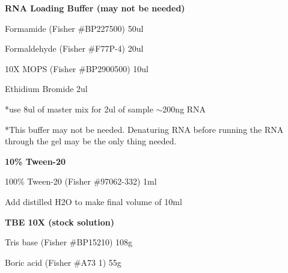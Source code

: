 \documentclass[11pt, oneside]{article}
\begin{document}
		\vspace{5mm}

		{\bf RNA Loading Buffer (may not be needed)}

			\hspace{2mm}Formamide \hspace{9mm}	(Fisher \#BP227500)	\hspace{5mm}	50ul

			\hspace{2mm}Formaldehyde \hspace{5mm}	(Fisher \#F77P-4)	\hspace{9mm}	20ul

			\hspace{2mm}10X MOPS 	\hspace{9mm}	(Fisher \#BP2900500) \hspace{3mm}	10ul

			\hspace{2mm}Ethidium Bromide	\hspace{40mm}					2ul

			\hspace{2mm}*use 8ul of master mix for 2ul of sample $\sim$200ng RNA

			\begin{adjustwidth}{7mm}{0pt}*This buffer may not be needed. Denaturing RNA before running the RNA through the gel may be the only 				thing needed. 
			\end{adjustwidth}
			
		\vspace{5mm}

		{\bf 10\% Tween-20}

			\hspace{2mm}100\% Tween-20 \hspace{2mm}(Fisher \#97062-332)\hspace{7mm}	1ml

			\hspace{2mm}Add distilled H2O to make final volume of 	10ml

		\vspace{5mm}


		{\bf TBE 10X (stock solution)}

			\hspace{2mm}Tris base 	\hspace{5mm}	(Fisher \#BP15210)	\hspace{5mm}	108g

			\hspace{2mm}Boric acid 	\hspace{3mm}	(Fisher \#A73 1)	\hspace{11mm}	55g
\end{document}
